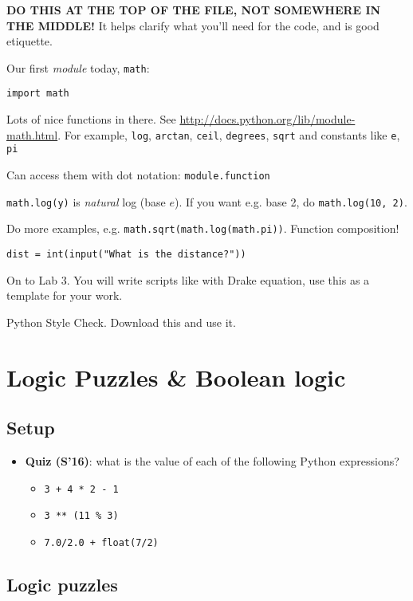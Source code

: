 \documentclass{article}
\begin{document}
\textbf{DO THIS AT THE TOP OF THE FILE, NOT SOMEWHERE IN THE MIDDLE!}
It helps clarify what you'll need for the code, and is good etiquette.

Our first \emph{module} today, \verb|math|:
\begin{verbatim}
import math
\end{verbatim}

Lots of nice functions in there.  See
\url{http://docs.python.org/lib/module-math.html}.  For example,
\verb|log|, \verb|arctan|, \verb|ceil|, \verb|degrees|, \verb|sqrt|
and constants like \verb|e|, \verb|pi|

Can access them with dot notation: \verb|module.function|

\verb|math.log(y)| is \emph{natural} log (base $e$). If you want
e.g. base 2, do \verb|math.log(10, 2)|.

Do more examples, e.g. \verb|math.sqrt(math.log(math.pi))|.  Function
composition!

\begin{verbatim}
dist = int(input("What is the distance?"))
\end{verbatim}

On to Lab 3.  You will write scripts like with Drake equation, use
this as a template for your work.

Python Style Check.  Download this and use it.

\newpage
\section{Logic Puzzles \& Boolean logic}

\subsection*{Setup}
\begin{itemize}
\item \textbf{Quiz (S'16)}: what is the value of each of the following
  Python expressions?
  \begin{itemize}
  \item \verb|3 + 4 * 2 - 1|
  \item \verb|3 ** (11 % 3)|
  \item \verb|7.0/2.0 + float(7/2)|
  \end{itemize}
\end{itemize}

\subsection*{Logic puzzles}
\end{document}
